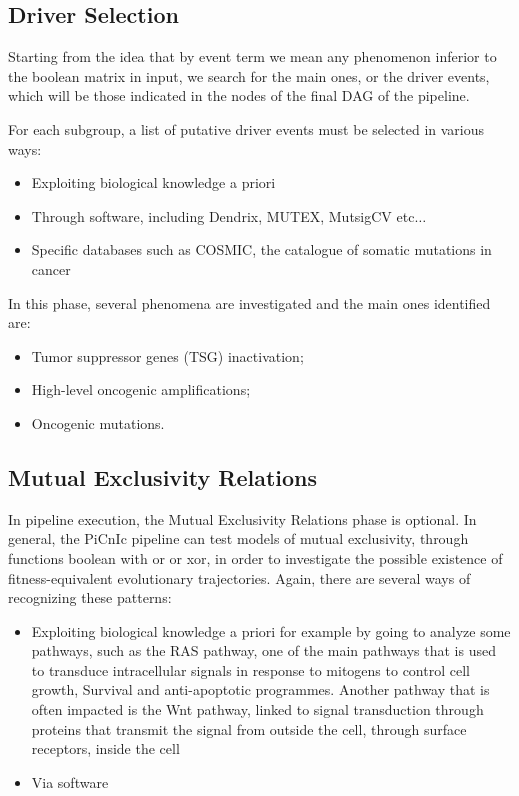 \subsection{Driver Selection}
Starting from the idea that by event term we mean any phenomenon inferior to the
boolean matrix in input, we search for the main ones, or the driver events, which
will be those indicated in the nodes of the final DAG of the pipeline.

For each subgroup, a list of putative driver events must be selected in various ways:
\begin{itemize}
    \item Exploiting biological knowledge a priori
    \item Through software, including Dendrix, MUTEX, MutsigCV etc$\dots$
    \item Specific databases such as COSMIC, the catalogue of somatic mutations in cancer
\end{itemize}

In this phase, several phenomena are investigated and the main ones identified are:
\begin{itemize}
    \item Tumor suppressor genes (TSG) inactivation;
    \item High-level oncogenic amplifications;
    \item Oncogenic mutations.
\end{itemize}
\subsection{Mutual Exclusivity Relations}
In pipeline execution, the Mutual Exclusivity Relations phase is optional. In
general, the PiCnIc pipeline can test models of mutual exclusivity, through
functions boolean with or or xor, in order to investigate the possible existence
of fitness-equivalent evolutionary trajectories. Again, there are several ways
of recognizing these patterns:
\begin{itemize}
    \item Exploiting biological knowledge a priori  for example by going to analyze
          some pathways, such as the RAS pathway, one of the main pathways that is used
          to transduce intracellular signals in response to mitogens to control cell
          growth, Survival and anti-apoptotic programmes. Another pathway that is often
          impacted is the Wnt pathway, linked to signal transduction through proteins
          that transmit the signal from outside the cell, through surface receptors,
          inside the cell
    \item Via software
\end{itemize}

